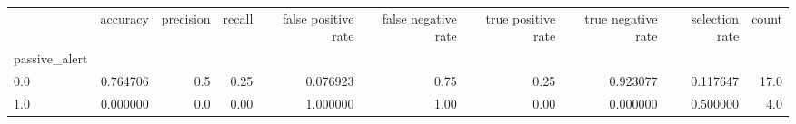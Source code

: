 \begin{tabular}{lrrrrrrrrr}
\toprule
{} &  accuracy &  precision &  recall &  false positive rate &  false negative rate &  true positive rate &  true negative rate &  selection rate &  count \\
passive\_alert &           &            &         &                      &                      &                     &                     &                 &        \\
\midrule
0.0           &  0.764706 &        0.5 &    0.25 &             0.076923 &                 0.75 &                0.25 &            0.923077 &        0.117647 &   17.0 \\
1.0           &  0.000000 &        0.0 &    0.00 &             1.000000 &                 1.00 &                0.00 &            0.000000 &        0.500000 &    4.0 \\
\bottomrule
\end{tabular}
